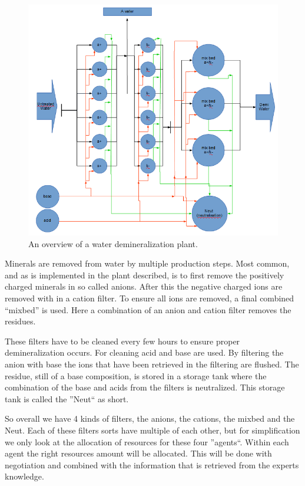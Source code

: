 \begin{figure}
	\centering
	\includegraphics[width=1\linewidth]{img/demi-plant}
	\caption{An overview of a water demineralization plant.}
	\label{fig:demi-plant}
\end{figure}

Minerals are removed from water by multiple production steps. Most common, and as is implemented in the plant described, is to first remove the positively charged minerals in so called anions. After this the negative charged ions are removed with in a cation filter. To ensure all ions are removed, a final combined ``mixbed'' is used. Here a combination of an anion and cation filter removes the residues.

These filters have to be cleaned every few hours to ensure proper demineralization occurs. For cleaning acid and base are used. By filtering the anion with base the ions that have been retrieved in the filtering are flushed. The residue, still of a base composition, is stored in a storage tank where the combination of the base and acids from the filters is neutralized. This storage tank is called the ''Neut`` as short.

So overall we have 4 kinds of filters, the anions, the cations, the mixbed and the Neut. Each of these filters sorts have multiple of each other, but for simplification we only look at the allocation of resources for these four ''agents``. Within each agent the right resources amount will be allocated. This will be done with negotiation and combined with the information that is retrieved from the experts knowledge.


